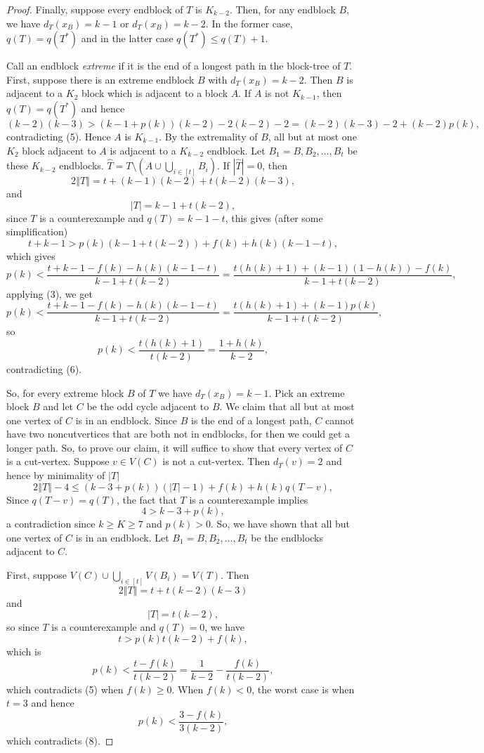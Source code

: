 \documentclass[12pt]{article}
\theoremstyle{plain}
\theoremstyle{definition}
\theoremstyle{remark}
\newcommand{\card}[1]{\left|#1\right|}
\newcommand{\size}[1]{\left\Vert#1\right\Vert}
\newcommand{\irange}[1]{\left[#1\right]}
\newcommand{\parens}[1]{\left( #1 \right)}
\begin{document}
\begin{proof}
		 Finally, suppose every endblock of $T$ is $K_{k-2}$.  Then, for any endblock $B$, we have $d_T(x_B) = k - 1$ or $d_T(x_B) = k-2$.  In the former case, $q(T) = q(T^*)$ and in the latter case $q(T^*) \le q(T) + 1$.  
		 
		 Call an endblock \emph{extreme} if it is the end of a longest path in the block-tree of $T$.  First, suppose there is an extreme endblock $B$ with $d_T(x_B) = k-2$.  Then $B$ is adjacent to a $K_2$ block which is adjacent to a block $A$.
		 If $A$ is not $K_{k-1}$, then $q(T) = q(T^*)$ and hence
		 \[(k-2)(k-3) > (k-1 + p(k))(k-2) - 2(k-2) - 2 = (k-2)(k-3) - 2 + (k-2)p(k),\]
		 contradicting (5).  Hence $A$ is $K_{k-1}$.  By the extremality of $B$, all but at most one $K_2$ block adjacent to $A$ is adjacent to a $K_{k-2}$ endblock.  Let $B_1 = B, B_2, \ldots, B_t$ be these $K_{k-2}$ endblocks.
		 $\hat{T} = T \setminus \parens{A \cup \bigcup_{i \in \irange{t}} B_i}$.  If $|\hat{T}| = 0$, then
		 \[2\size{T} = t + (k-1)(k-2) + t(k-2)(k-3),\]
		 and
		 \[\card{T} = k-1 + t(k-2),\]
		 since $T$ is a counterexample and $q(T) = k-1 - t$, this gives (after some simplification)
		 \[t + k - 1 > p(k)(k-1 + t(k-2)) + f(k) + h(k)(k-1-t),\]
		 which gives
		 \[p(k) < \frac{t+k-1 - f(k) - h(k)(k-1-t)}{k-1+t(k-2)} = \frac{t(h(k) + 1) + (k-1)(1-h(k)) - f(k)}{k-1+t(k-2)},\]
		 applying (3), we get
		 \[p(k) < \frac{t+k-1 - f(k) - h(k)(k-1-t)}{k-1+t(k-2)} = \frac{t(h(k) + 1) + (k-1)p(k)}{k-1+t(k-2)},\]
		 so
		 \[p(k) < \frac{t(h(k) + 1)}{t(k-2)} = \frac{1 + h(k)}{k-2},\]
		 contradicting (6).
		 
		  
		  So, for every extreme block $B$ of $T$ we have $d_T(x_B) = k - 1$.  Pick an extreme block $B$ and let $C$ be the odd cycle adjacent to $B$.  We claim that all but at most one vertex of $C$ is in an endblock.  Since $B$ is the end of a longest path, $C$ cannot have two noncutvertices that are both not in endblocks, for then we could get a longer path.  So, to prove our claim, it will suffice to show that every vertex of $C$ is a cut-vertex.  Suppose $v \in V(C)$ is not a cut-vertex.  Then $d_T(v) = 2$ and hence by minimality of $\card{T}$
		 \[2\size{T} - 4 \le (k-3 + p(k))\parens{\card{T} - 1} + f(k) + h(k)q(T - v),\]
		 Since $q(T-v) = q(T)$, the fact that $T$ is a counterexample implies
		 \[4 > k-3 + p(k),\]
		 a contradiction since $k \ge K \ge 7$ and $p(k) > 0$.  So, we have shown that all but one vertex of $C$ is in an endblock.  Let $B_1 = B, B_2, \ldots, B_t$ be the endblocks adjacent to $C$.  
		 
		 First, suppose $V(C) \cup \bigcup_{i \in \irange{t}} V(B_i) = V(T)$.  Then
		 \[2\size{T} = t + t(k-2)(k-3)\]
		 and
		 \[\card{T} = t(k-2),\]
		 so since $T$ is a counterexample and $q(T) = 0$, we have 
		 \[t > p(k)t(k-2) + f(k),\]
		 which is
		 \[p(k) < \frac{t - f(k)}{t(k-2)} = \frac{1}{k-2} - \frac{f(k)}{t(k-2)},\]
		 which contradicts (5) when $f(k) \ge 0$.  When $f(k) < 0$, the worst case is when $t = 3$ and hence
		 \[p(k) < \frac{3 - f(k)}{3(k-2)},\]
		 which contradicts (8).
		 

\end{proof}
\end{document}
